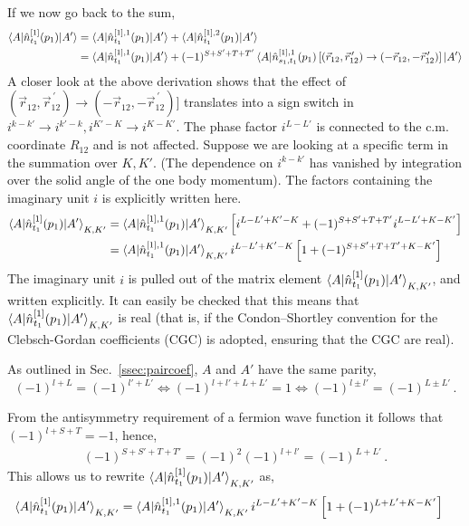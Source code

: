 \documentclass[10pt]{article}
\begin{document}
If we now go back to the sum,
\begin{align*}
	\braket{ A | \hat{n}_{t_1}^{[1]}(p_1) | A'} &= \braket{ A | \hat{n}_{t_1}^{[1],1}(p_1) | A'} + \braket{ A | \hat{n}_{t_1}^{[1],2}(p_1) | A'} \\
	&= \braket{ A | \hat{n}_{t_1}^{[1],1}(p_1) | A'} + (-1)^{S+S'+T+T'} \braket{ A | \hat{n}^{[1],1}_{s_1,t_1}(p_1) \left[ ( \vec{r}_{12}, \vec{r}_{12}^{\, \prime} ) \rightarrow ( - \vec{r}_{12}, - \vec{r}_{12}^{\, \prime} ) \right] | A'} 
\end{align*}
A closer look at the above derivation shows that the effect of $ ( \vec{r}_{12}, \vec{r}_{12}^{\, \prime} ) \rightarrow ( - \vec{r}_{12}, - \vec{r}_{12}^{\, \prime} )]$ translates into a sign switch in $i^{k-k'} \rightarrow i^{k'-k}, i^{K'-K} \rightarrow i^{K-K'}$.
The phase factor $i^{L-L'}$ is connected to the c.m. coordinate $R_{12}$ and is not affected.
Suppose we are looking at a specific term in the summation over $K,K'$. (The dependence on $i^{k-k'}$ has vanished by integration over the solid angle of the one body momentum).
The factors containing the imaginary unit $i$ is explicitly written here.
\begin{align*}
	\braket{ A | \hat{n}_{t_1}^{[1]}(p_1) | A'}_{K,K'} &= \braket{ A | \hat{n}_{t_1}^{[1],1}(p_1) | A'}_{K,K'} \left[ i^{L-L'+K'-K} + (-1)^{S+S'+T+T'} i^{L-L'+K-K'} \right] \\
	&= \braket{ A | \hat{n}_{t_1}^{[1],1}(p_1) | A'}_{K,K'} i^{L-L' + K'-K} \left[ 1 + (-1)^{S+S'+T+T'+K-K'} \right]
\end{align*}
The imaginary unit $i$ is pulled out of the matrix element $\braket{ A | \hat{n}_{t_1}^{[1]}(p_1) | A'}_{K,K'}$, and written explicitly. It can easily be checked that this means that $\braket{ A | \hat{n}_{t_1}^{[1]}(p_1) | A'}_{K,K'}$ is real (that is, if the Condon–Shortley convention for the Clebsch-Gordan coefficients (CGC) is adopted, ensuring that the CGC are real).

As outlined in Sec.~\ref{ssec:paircoef}, $A$ and $A'$ have the same parity,
\begin{equation}
	(-1)^{l+L} = (-1)^{l'+L'} \Leftrightarrow (-1)^{l+l'+L+L'} = 1 \Leftrightarrow (-1)^{l \pm l'} = (-1)^{L \pm L'}  \, .
	\label{eq:parity_phase_id}
\end{equation}

From the antisymmetry requirement of a fermion wave function it follows that $(-1)^{l+S+T}=-1$, hence,
\begin{align}
	(-1)^{S+S'+T+T'} = (-1)^{2}(-1)^{l+l'} = (-1)^{L+L'} \, .
	\label{eq:antisymm_phase_id}
\end{align}
This allows us to rewrite $\braket{ A | \hat{n}_{t_1}^{[1]}(p_1) | A'}_{K,K'}$ as,
\begin{align*}
	\braket{ A | \hat{n}_{t_1}^{[1]}(p_1) | A'}_{K,K'} &= \braket{ A | \hat{n}_{t_1}^{[1],1}(p_1) | A'}_{K,K'} i^{L-L' + K'-K} \left[ 1 + (-1)^{L+L'+K-K'} \right]
\end{align*}
\end{document}
